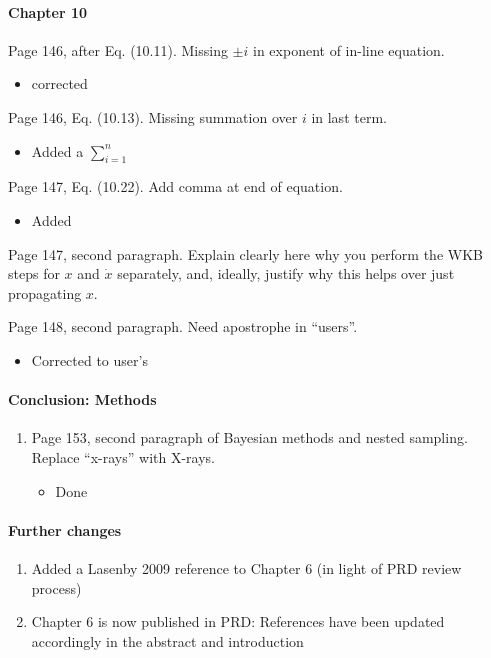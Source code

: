 \documentclass[11pt]{article}
\newcommand{\todo}[1]{{\color{red} #1}}
\begin{document}
\paragraph{Chapter 10}
\begin{enumerate}
\item Page 146, after Eq. (10.11). Missing $\pm i$ in exponent of
  in-line equation.
  \begin{itemize}
      \item corrected
  \end{itemize}
\item Page 146, Eq. (10.13). Missing summation over $i$ in last term.
    \begin{itemize}
        \item Added a $\sum_{i=1}^{n}$
    \end{itemize}
\item Page 147, Eq. (10.22). Add comma at end of equation.
    \begin{itemize}
        \item Added
    \end{itemize}
    \todo{%
\item Page 147, second paragraph. Explain clearly here why you perform
  the WKB steps for $x$ and $\dot{x}$ separately, and, ideally,
  justify why this helps over just propagating $x$.
  }
\item Page 148, second paragraph. Need apostrophe in ``users''.
    \begin{itemize}
        \item Corrected to user's
    \end{itemize}
\end{enumerate}

\paragraph{Conclusion: Methods}
\begin{enumerate}
\item Page 153, second paragraph of Bayesian methods and nested
  sampling. Replace ``x-rays'' with X-rays.
  \begin{itemize}
      \item Done
  \end{itemize}
\end{enumerate}



\paragraph{Further changes}
\begin{enumerate}
    \item Added a Lasenby 2009 reference to Chapter 6 (in light of PRD review process)
    \item Chapter 6 is now published in PRD: References have been updated accordingly in the abstract and introduction
\end{enumerate}
\end{document}
